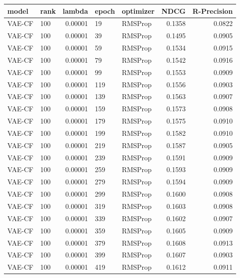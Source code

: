 \begin{tabular}{llrllrr}
\toprule
   model & rank &   lambda & epoch & optimizer &    NDCG &  R-Precision \\
\midrule
  VAE-CF &  100 &  0.00001 &    19 &   RMSProp &  0.1358 &       0.0822 \\
  VAE-CF &  100 &  0.00001 &    39 &   RMSProp &  0.1495 &       0.0905 \\
  VAE-CF &  100 &  0.00001 &    59 &   RMSProp &  0.1534 &       0.0915 \\
  VAE-CF &  100 &  0.00001 &    79 &   RMSProp &  0.1542 &       0.0916 \\
  VAE-CF &  100 &  0.00001 &    99 &   RMSProp &  0.1553 &       0.0909 \\
  VAE-CF &  100 &  0.00001 &   119 &   RMSProp &  0.1556 &       0.0903 \\
  VAE-CF &  100 &  0.00001 &   139 &   RMSProp &  0.1563 &       0.0907 \\
  VAE-CF &  100 &  0.00001 &   159 &   RMSProp &  0.1573 &       0.0908 \\
  VAE-CF &  100 &  0.00001 &   179 &   RMSProp &  0.1575 &       0.0910 \\
  VAE-CF &  100 &  0.00001 &   199 &   RMSProp &  0.1582 &       0.0910 \\
  VAE-CF &  100 &  0.00001 &   219 &   RMSProp &  0.1587 &       0.0905 \\
  VAE-CF &  100 &  0.00001 &   239 &   RMSProp &  0.1591 &       0.0909 \\
  VAE-CF &  100 &  0.00001 &   259 &   RMSProp &  0.1593 &       0.0909 \\
  VAE-CF &  100 &  0.00001 &   279 &   RMSProp &  0.1594 &       0.0909 \\
  VAE-CF &  100 &  0.00001 &   299 &   RMSProp &  0.1600 &       0.0908 \\
  VAE-CF &  100 &  0.00001 &   319 &   RMSProp &  0.1603 &       0.0908 \\
  VAE-CF &  100 &  0.00001 &   339 &   RMSProp &  0.1602 &       0.0907 \\
  VAE-CF &  100 &  0.00001 &   359 &   RMSProp &  0.1605 &       0.0909 \\
  VAE-CF &  100 &  0.00001 &   379 &   RMSProp &  0.1608 &       0.0913 \\
  VAE-CF &  100 &  0.00001 &   399 &   RMSProp &  0.1607 &       0.0903 \\
  VAE-CF &  100 &  0.00001 &   419 &   RMSProp &  0.1612 &       0.0911 \\

\end{tabular}
